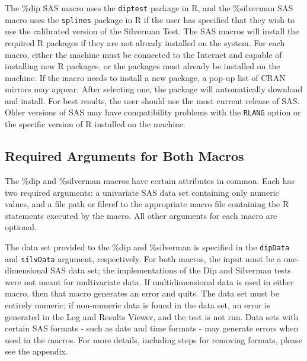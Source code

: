 \documentclass[]{interact}
\theoremstyle{plain}%
\theoremstyle{definition}
\theoremstyle{remark}
\begin{document}
The \%dip SAS macro uses the \texttt{diptest} package in R, and the \%silverman SAS macro uses the \texttt{splines} package in R if the user has specified that they wish to use the calibrated version of the Silverman Test. The SAS macros will install the required R packages if they are not already installed on the system. For each macro, either the machine must be connected to the Internet and capable of installing new R packages, or the packages must already be installed on the machine. If the macro needs to install a new package, a pop-up list of CRAN mirrors may appear. After selecting one, the package will automatically download and install. For best results, the user should use the most current release of SAS. Older versions of SAS may have compatibility problems with the \texttt{RLANG} option or the specific version of R installed on the machine.

\subsection{Required Arguments for Both Macros}
The \%dip and \%silverman macros have certain attributes in common. Each has two required arguments: a univariate SAS data set containing only numeric values, and a file path or fileref to the appropriate macro file containing the R statements executed by the macro. All other arguments for each macro are optional.

The data set provided to the \%dip and \%silverman is specified in the \texttt{dipData} and \texttt{silvData} argument, respectively. For both macros, the input must be a one-dimensional SAS data set; the implementations of the Dip and Silverman tests were not meant for multivariate data. If multidimensional data is used in either macro, then that macro generates an error and quits. The data set must be entirely numeric; if non-numeric data is found in the data set, an error is generated in the Log and Results Viewer, and the test is not run. Data sets with certain SAS formats - such as date and time formats - may generate errors when used in the macros. For more details, including steps for removing formats, please see the appendix.
\end{document}
